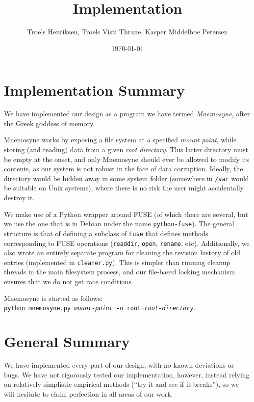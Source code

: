 \documentclass[12pt]{article}
\author{
        Troels Henriksen, Troels Visti Thrane, Kasper Middelboe Petersen
}
\date{\today}
\title{Implementation}
\begin{document}
 
\maketitle

\section{Implementation Summary}

We have implemented our design as a program we have termed
\textit{Mnemosyne}, after the Greek goddess of memory.

Mnemosyne works by exposing a file system at a specified \textit{mount
  point}, while storing (and reading) data from a given \textit{root
  directory}.  This latter directory must be empty at the onset, and
only Mnemosyne should ever be allowed to modify its contents, as our
system is not robust in the face of data corruption.  Ideally, the
directory would be hidden away in some system folder (somewhere in
\texttt{/var} would be suitable on Unix systems), where there is no
risk the user might accidentally destroy it.

We make use of a Python wrapper around FUSE (of which there are
several, but we use the one that is in Debian under the name
\texttt{python-fuse}).  The general structure is that of defining a
subclass of \texttt{Fuse} that defines methods corresponding to FUSE
operations (\texttt{readdir}, \texttt{open}, \texttt{rename}, etc).
Additionally, we also wrote an entirely separate program for cleaning
the revision history of old entries (implemented in
\texttt{cleaner.py}).  This is simpler than running cleanup threads in
the main filesystem process, and our file-based locking mechanism
ensures that we do not get race conditions.

Mnemosyne is started as follows:\\
\texttt{python mnemosyne.py \textit{mount-point} -o
  root=\textit{root-directory}}.

\section{General Summary}

We have implemented every part of our design, with no known deviations
or bugs.  We have not rigorously tested our implementation, however,
instead relying on relatively simplistic empirical methods (``try it
and see if it breaks''), so we will hesitate to claim perfection in
all areas of our work.
\end{document}
